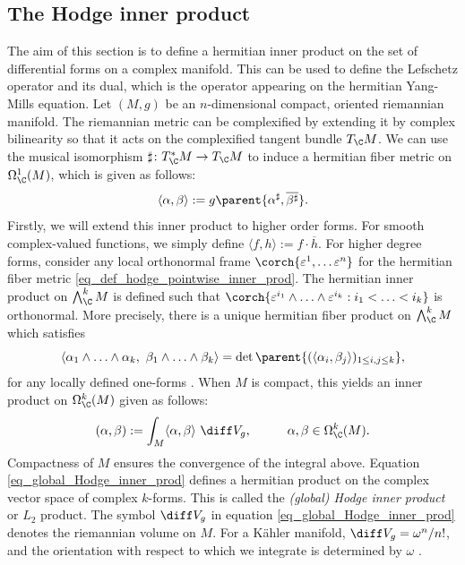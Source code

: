 \subsection{The Hodge inner product}
The aim of this section is to define a hermitian inner product on the set of differential forms on a complex manifold. This can be used to define the Lefschetz operator and its dual, which is the operator appearing on the hermitian Yang-Mills equation. Let \((M,g)\) be an \(n\)-dimensional compact, oriented riemannian manifold. The riemannian metric can be complexified by extending it by complex bilinearity so that it acts on the complexified tangent bundle \(T_\C M\). We can use the musical isomorphism \(\sharp\colon T_\C^*M \to T_\C M\) to induce a hermitian fiber metric on \(\Omega_\C^1(M)\), which is given as follows:
\begin{equation} \label{eq_def_hodge_pointwise_inner_prod}
\langle \alpha, \beta \rangle :=g\parent{\alpha^\sharp, \overline{\beta^\sharp}}.
\end{equation}
Firstly, we will extend this inner product to higher order forms. For smooth complex-valued functions, we simply define \(\langle f,h \rangle := f\cdot \overline{h}\). For higher degree forms, consider any local orthonormal frame \(\corch{\varepsilon^1, \ldots \varepsilon^n}\) for the hermitian fiber metric \eqref{eq_def_hodge_pointwise_inner_prod}. The hermitian inner product on \(\bigwedge_\C^k M\) is defined such that \(\corch{\varepsilon^{i_1} \wedge \ldots \wedge \varepsilon^{i_k}: i_1 < \ldots < i_k}\) is orthonormal. More precisely, there is a unique hermitian fiber product on \(\bigwedge^k_\C M\) which satisfies
\[
\langle \alpha_1 \wedge \ldots \wedge \alpha_k, \ \beta_1 \wedge \ldots \wedge \beta_k \rangle =\det \parent{(\langle \alpha_i, \beta_j \rangle)_{1 \leq i,j \leq k}},
\]
for any locally defined one-forms \parencite[Lemma 9.1]{lee_introCM}. When \(M\) is compact, this yields an inner product on \(\Omega_\C^k(M)\) given as follows:
\begin{equation} \label{eq_global_Hodge_inner_prod}
    (\alpha, \beta):=\int_M \langle \alpha, \beta \rangle \ \diff V_g, \hspace{1 cm} \alpha, \beta \in \Omega_\C^k(M).
\end{equation} 
Compactness of \(M\) ensures the convergence of the integral above. Equation \eqref{eq_global_Hodge_inner_prod} defines a hermitian product on the complex vector space of complex \(k\)-forms. This is called the \textit{(global) Hodge inner product} or \(L_2\) product. The symbol \(\diff V_g\) in equation \eqref{eq_global_Hodge_inner_prod} denotes the riemannian volume on \(M\). For a Kähler manifold, \(\diff V_g=\omega^n/n!\), and the orientation with respect to which we integrate is determined by \(\omega\) \parencite[Lemma 8.17]{lee_introCM}.

